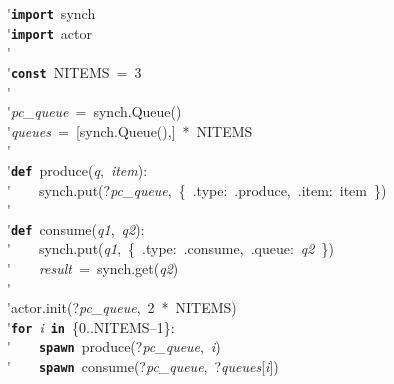 \'\>\texttt{\textbf{import}}~synch\\

\'\>\texttt{\textbf{import}}~actor\\

\'\>\\

\'\>\texttt{\textbf{const}}~NITEMS~=~3\\

\'\>\\

\'\>\textit{pc\_queue}~=~synch.Queue()\\

\'\>\textit{queues}~=~[synch.Queue(),]~*~NITEMS\\

\'\>\\

\'\>\texttt{\textbf{def}}~produce(\textit{q},~\textit{item}):\\

\'\>~~~~synch.put(?\textit{pc\_queue},~\{~.type:~.produce,~.item:~item~\})\\

\'\>\\

\'\>\texttt{\textbf{def}}~consume(\textit{q1},~\textit{q2}):\\

\'\>~~~~synch.put(\textit{q1},~\{~.type:~.consume,~.queue:~\textit{q2}~\})\\

\'\>~~~~\textit{result}~=~synch.get(\textit{q2})\\

\'\>\\

\'\>actor.init(?\textit{pc\_queue},~2~*~NITEMS)\\

\'\>\texttt{\textbf{for}}~\textit{i}~\texttt{\textbf{in}}~\{0..NITEMS--1\}:\\

\'\>~~~~\texttt{\textbf{spawn}}~produce(?\textit{pc\_queue},~\textit{i})\\

\'\>~~~~\texttt{\textbf{spawn}}~consume(?\textit{pc\_queue},~?\textit{queues}[\textit{i}])